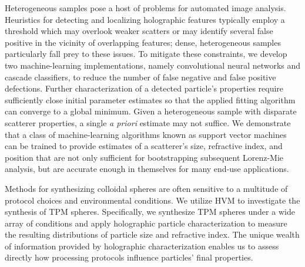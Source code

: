 Heterogeneous samples pose a host of problems for automated
image analysis. Heuristics for detecting and localizing holographic
features typically employ a threshold which may overlook weaker
scatters or may identify several false positive in the vicinity of
overlapping features; dense, heterogeneous samples
particularly fall prey to these issues. To mitigate these constraints, we
develop two machine-learning implementations, namely convolutional
neural networks and cascade classifiers, to reduce the number of
false negative and false positive defections. 
Further characterization of a detected particle's properties require
sufficiently close initial parameter estimates so that the applied
fitting algorithm can converge to a global minimum.
 Given a heterogeneous sample
with disparate scatterer properties, a single \emph{a priori}
estimate may not suffice. We demonstrate that a class of machine-learning
algorithms known as support vector machines can be trained to
provide estimates of a scatterer's size, refractive index, and
position that are not only sufficient for bootstrapping subsequent
Lorenz-Mie analysis, but are accurate enough in themselves
for many end-use applications.

Methods for synthesizing colloidal spheres are often sensitive
to a multitude of protocol choices and environmental conditions. We
utilize HVM to investigate the synthesis of TPM spheres.
Specifically, we synthesize TPM spheres under a wide array of
conditions and apply holographic particle characterization to measure the
resulting distributions of particle size and refractive index.
The unique wealth of information provided by holographic characterization
enables us to assess directly how processing protocols influence
particles' final properties.





